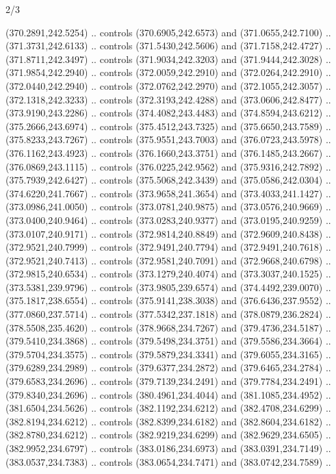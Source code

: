 \begin{flagdescription}{2/3}
\begin{scope}[xshift=0.5\flaglength,yshift=0.5\flagwidth,scale=\flagwidth/495.65]
\begin{scope}[y=0.8pt, x=0.8pt, yscale=-1,shift={(-463.76,-309.78)}]
  (370.2891,242.5254) .. controls (370.6905,242.6573) and (371.0655,242.7100) ..
  (371.3731,242.6133) .. controls (371.5430,242.5606) and (371.7158,242.4727) ..
  (371.8711,242.3497) .. controls (371.9034,242.3203) and (371.9444,242.3028) ..
  (371.9854,242.2940) .. controls (372.0059,242.2910) and (372.0264,242.2910) ..
  (372.0440,242.2940) .. controls (372.0762,242.2970) and (372.1055,242.3057) ..
  (372.1318,242.3233) .. controls (372.3193,242.4288) and (373.0606,242.8477) ..
  (373.9190,243.2286) .. controls (374.4082,243.4483) and (374.8594,243.6212) ..
  (375.2666,243.6974) .. controls (375.4512,243.7325) and (375.6650,243.7589) ..
  (375.8233,243.7267) .. controls (375.9551,243.7003) and (376.0723,243.5978) ..
  (376.1162,243.4923) .. controls (376.1660,243.3751) and (376.1485,243.2667) ..
  (376.0869,243.1115) .. controls (376.0225,242.9562) and (375.9316,242.7892) ..
  (375.7939,242.6427) .. controls (375.5068,242.3439) and (375.0586,242.0304) ..
  (374.6220,241.7667) .. controls (373.9658,241.3654) and (373.4033,241.1427) ..
  (373.0986,241.0050) .. controls (373.0781,240.9875) and (373.0576,240.9669) ..
  (373.0400,240.9464) .. controls (373.0283,240.9377) and (373.0195,240.9259) ..
  (373.0107,240.9171) .. controls (372.9814,240.8849) and (372.9609,240.8438) ..
  (372.9521,240.7999) .. controls (372.9491,240.7794) and (372.9491,240.7618) ..
  (372.9521,240.7413) .. controls (372.9581,240.7091) and (372.9668,240.6798) ..
  (372.9815,240.6534) .. controls (373.1279,240.4074) and (373.3037,240.1525) ..
  (373.5381,239.9796) .. controls (373.9805,239.6574) and (374.4492,239.0070) ..
  (375.1817,238.6554) .. controls (375.9141,238.3038) and (376.6436,237.9552) ..
  (377.0860,237.5714) .. controls (377.5342,237.1818) and (378.0879,236.2824) ..
  (378.5508,235.4620) .. controls (378.9668,234.7267) and (379.4736,234.5187) ..
  (379.5410,234.3868) .. controls (379.5498,234.3751) and (379.5586,234.3664) ..
  (379.5704,234.3575) .. controls (379.5879,234.3341) and (379.6055,234.3165) ..
  (379.6289,234.2989) .. controls (379.6377,234.2872) and (379.6465,234.2784) ..
  (379.6583,234.2696) .. controls (379.7139,234.2491) and (379.7784,234.2491) ..
  (379.8340,234.2696) .. controls (380.4961,234.4044) and (381.1085,234.4952) ..
  (381.6504,234.5626) .. controls (382.1192,234.6212) and (382.4708,234.6299) ..
  (382.8194,234.6212) .. controls (382.8399,234.6182) and (382.8604,234.6182) ..
  (382.8780,234.6212) .. controls (382.9219,234.6299) and (382.9629,234.6505) ..
  (382.9952,234.6797) .. controls (383.0186,234.6973) and (383.0391,234.7149) ..
  (383.0537,234.7383) .. controls (383.0654,234.7471) and (383.0742,234.7589) ..

\end{scope}
\end{scope}
\end{flagdescription}
